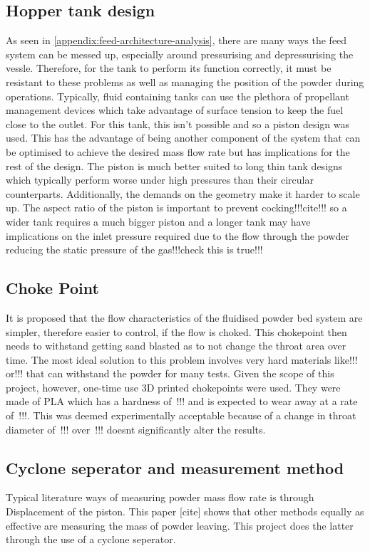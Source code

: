 \subsection{Hopper tank design}
As seen in \autoref{appendix:feed-architecture-analysis}, there are many ways the feed system can be messed up, especially around pressurising and depressurising the vessle. Therefore, for the tank to perform its function correctly, it must be resistant to these problems as well as managing the position of the powder during operations. Typically, fluid containing tanks can use the plethora of propellant management devices which take advantage of surface tension to keep the fuel close to the outlet. For this tank, this isn't possible and so a piston design was used. This has the advantage of being another component of the system that can be optimised to achieve the desired mass flow rate but has implications for the rest of the design. The piston is much better suited to long thin tank designs which typically perform worse under high pressures than their circular counterparts. Additionally, the demands on the geometry make it harder to scale up. The aspect ratio of the piston is important to prevent cocking!!!cite!!! so a wider tank requires a much bigger piston and a longer tank may have implications on the inlet pressure required due to the flow through the powder reducing the static pressure of the gas!!!check this is true!!!
\subsection{Choke Point}
It is proposed that the flow characteristics of the fluidised powder bed system are simpler, therefore easier to control, if the flow is choked. This chokepoint then needs to withstand getting sand blasted as to not change the throat area over time. The most ideal solution to this problem involves very hard materials like!!! or!!! that can withstand the powder for many tests. Given the scope of this project, however, one-time use 3D printed chokepoints were used. They were made of PLA which has a hardness of~!!! and is expected to wear away at a rate of~!!!. This was deemed experimentally acceptable because of a change in throat diameter of~!!! over~!!! doesnt significantly alter the results.

\newpage
\subsection{Cyclone seperator and measurement method}
Typical literature ways of measuring powder mass flow rate is through Displacement of the piston. This paper [cite] shows that other methods equally as effective are measuring the mass of powder leaving. This project does the latter through the use of a cyclone seperator.

